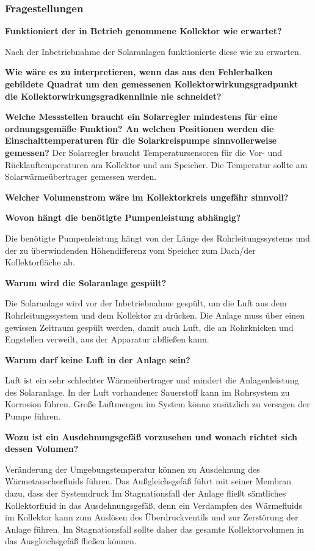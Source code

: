 \subsubsection{Fragestellungen}

\textbf{Funktioniert der in Betrieb genommene Kollektor wie erwartet?}

Nach der Inbetriebnahme der Solaranlagen funktionierte diese wie zu erwarten. 

\textbf{Wie wäre es zu interpretieren, wenn das aus den Fehlerbalken gebildete Quadrat um den gemessenen Kollektorwirkungsgradpunkt die Kollektorwirkungsgradkennlinie nie schneidet?}

\textbf{Welche Messstellen braucht ein Solarregler mindestens für eine ordnungsgemäße
	Funktion? An welchen Positionen werden die Einschalttemperaturen für die Solarkreispumpe
	sinnvollerweise gemessen?}
Der Solarregler braucht Temperatursensoren für die Vor- und Rücklauftemperaturen am Kollektor und am Speicher. Die Temperatur sollte am Solarwärmeübertrager gemessen werden. 

\textbf{Welcher Volumenstrom wäre im Kollektorkreis ungefähr sinnvoll?}

\textbf{Wovon hängt die benötigte Pumpenleistung abhängig?}

Die benötigte Pumpenleistung hängt von der Länge des Rohrleitungssystems und der zu überwindenden Höhendifferenz vom Speicher zum Dach/der Kollektorfläche ab. 

\textbf{Warum wird die Solaranlage gespült?}

Die Solaranlage wird vor der Inbetriebnahme gespült, um die Luft aus dem Rohrleitungssystem und dem Kollektor zu drücken. Die Anlage muss über einen gewissen Zeitraum gespült werden, damit auch Luft, die an Rohrknicken und Engstellen verweilt, aus der Apparatur abfließen kann.

\textbf{Warum darf keine Luft in der Anlage sein?}

Luft ist ein sehr schlechter Wärmeübertrager und mindert die Anlagenleistung des Solaranlage. In der Luft vorhandener Sauerstoff kann im Rohrsystem zu Korrosion führen. Große Luftmengen im System könne zusätzlich zu versagen der Pumpe führen. 

\textbf{Wozu ist ein Ausdehnungsgefäß vorzusehen und wonach richtet sich dessen Volumen?}

Veränderung der Umgebungstemperatur können zu Ausdehnung des Wärmetauscherfluids führen. Das Außgleichsgefäß führt mit seiner Membran dazu, dass der Systemdruck Im Stagnationsfall der Anlage fließt sämtliches Kollektorfluid in das Ausdehnungsgefäß, denn ein Verdampfen des Wärmefluids im Kollektor kann zum Auslösen des Überdruckventils und zur Zerstörung der Anlage führen. Im Stagnationsfall sollte daher das gesamte Kollektorvolumen in das Ausgleichsgefäß fließen können.

